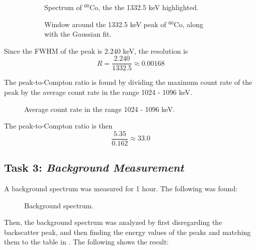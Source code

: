 \documentclass{article}
\begin{document}
\begin{figure}[h!]
	\centering
	\begin{subfigure}[t]{0.45\textwidth}
		\centering
		\scalebox{0.5}{}
		\caption{Spectrum of $^{60}$Co, the the 1332.5 keV highlighted.}
		\label{fig:Co60Broad}
	\end{subfigure}
	\hspace{0.5cm}
	\begin{subfigure}[t]{0.45\textwidth}
		\centering
		\scalebox{0.5}{}
		\caption{Window around the 1332.5 keV peak of $^{60}$Co, along with the Gaussian fit.}
		\label{fig:Co60window}
	\end{subfigure}
	\caption{}
	\label{fig:energyresolution}
\end{figure}

Since the FWHM of the peak is $2.240$ keV, the resolution is 
\[R = \frac{2.240}{1332.5} \approx \boxed{0.00168}\]

The peak-to-Compton ratio is found by dividing the maximum count rate of the peak by the average count rate in the range 1024 - 1096 keV. 

\begin{figure}[h!]
	\centering
	\scalebox{1}{}
	\caption{Average count rate in the range 1024 - 1096 keV.}
	\label{fig:AvgCountRate}
\end{figure}

The peak-to-Compton ratio is then
\[ \frac{5.35}{0.162} \approx \boxed{33.0} \]

\pagebreak{}

\subsection{Task 3: \textit{Background Measurement}}

A background spectrum was measured for 1 hour. The following was found:

\begin{figure}[h!]
	\centering
	\scalebox{1}{}
	\caption{Background spectrum.}
	\label{fig:Background}
\end{figure}

Then, the background spectrum was analyzed by first disregarding the backscatter peak, and then finding the energy values of the peaks and matching them to the table in \cite{plotzki_2024_highresolution}. The following shows the result:
\end{document}
